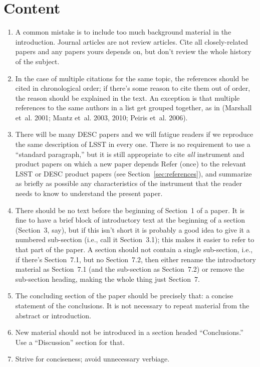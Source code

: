\documentclass[letterpaper,11pt]{article}
\begin{document}
\section{Content}

\begin{enumerate}

\item A common mistake is to include too much background material in the
introduction.  Journal articles are not review articles. Cite all
closely-related papers and any papers yours depends on, but don't review the
whole history of the subject.

\item In the case of multiple citations for the same topic, the references should be cited in chronological order; if there's some reason to cite them out of order, the reason should be explained in the text.
An exception is that multiple references to the same authors in a list get grouped together, as in (Marshall et~al. 2001; Mantz et~al. 2003, 2010; Peiris et~al. 2006).

\item There will be many DESC papers and we will fatigue readers if we
reproduce the same description of LSST in every one.
 There is no requirement to use a ``standard paragraph,''
but it is still appropriate to cite {\it all\/} instrument and product papers
on which a new paper depends
Refer (once)
to the relevant LSST or DESC product papers (see Section~\ref{sec:references}), and summarize as briefly as
possible any characteristics of the instrument that the reader needs to know
to understand the present paper.

\item
There should be no text before the beginning of Section~1 of a paper.
It is fine to have a brief block of introductory text at the beginning of a
section (Section~3, say), but if this isn't short it is probably a good idea to
give it a numbered sub-section (i.e., call it Section~3.1); this makes it
easier to refer to that part of the paper.  A section should not contain a
single sub-section, i.e., if there's Section~7.1, but no Section~7.2, then
either rename the introductory material as Section~7.1 (and the sub-section
as Section~7.2) or remove the sub-section heading, making the whole thing
just Section~7.


\item The concluding section of the paper should be precisely that: a concise
statement of the conclusions.  It is not necessary to repeat material from the
abstract or introduction.

\item New material should not be introduced in a section headed
``Conclusions.''  Use a ``Discussion'' section for that.

\item Strive for conciseness; avoid unnecessary verbiage.

\end{enumerate}
\end{document}
